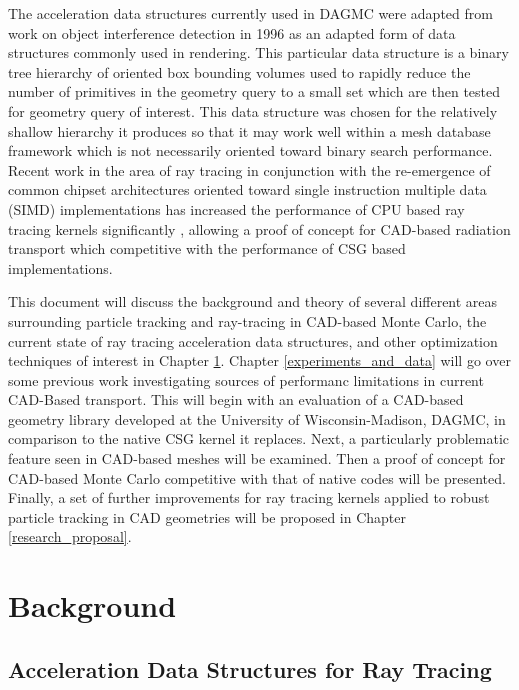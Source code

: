 \documentclass[12pt, a4paper]{article}
\begin{document}
The acceleration data structures currently used in DAGMC were adapted from work on object interference detection in 1996 \cite{Gottschalk_1996} as an adapted form of data structures commonly used in rendering. This particular data structure is a binary tree hierarchy of oriented box bounding volumes used to rapidly reduce the number of primitives in the geometry query to a small set which are then tested for geometry query of interest. This data structure was chosen for the relatively shallow hierarchy it produces so that it may work well within a mesh database framework which is not necessarily oriented toward binary search performance. Recent work in the area of ray tracing in conjunction with the re-emergence of common chipset architectures oriented toward single instruction multiple data (SIMD) implementations has increased the performance of CPU based ray tracing kernels significantly \cite{Wald_2008}, allowing a proof of concept for CAD-based radiation transport which competitive with the performance of CSG based implementations.

This document will discuss the background and theory of several different areas surrounding particle tracking and ray-tracing in CAD-based Monte Carlo, the current state of ray tracing acceleration data structures, and other optimization techniques of interest in Chapter \ref{background}. Chapter \ref{experiments_and_data} will go over some previous work investigating sources of performanc limitations in current CAD-Based transport. This will begin with an evaluation of a CAD-based geometry library developed at the University of Wisconsin-Madison, DAGMC, in comparison to the native CSG kernel it replaces. Next, a particularly problematic feature seen in CAD-based meshes will be examined. Then a proof of concept for CAD-based Monte Carlo competitive with that of native codes will be presented. Finally, a set of further improvements for ray tracing kernels applied to robust particle tracking in CAD geometries will be proposed in Chapter \ref{research_proposal}. 


\section{Background}%
\label{background}


\subsection{Acceleration Data Structures for Ray Tracing}
\label{subsec:accel_datastructures}
\end{document}
